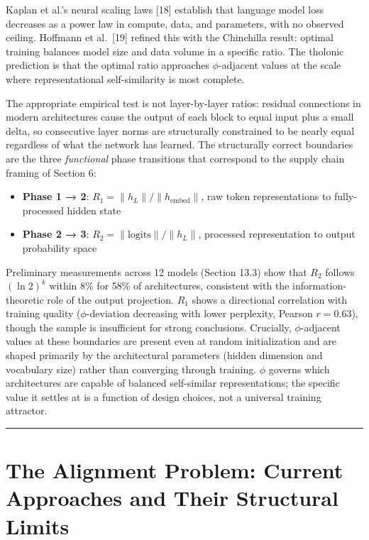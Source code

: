 \documentclass[12pt]{article}
\providecommand{\tightlist}{%
  \setlength{\itemsep}{0pt}\setlength{\parskip}{0pt}}
\begin{document}
Kaplan et al.'s neural scaling laws {[}18{]} establish that language
model loss decreases as a power law in compute, data, and parameters,
with no observed ceiling. Hoffmann et al.~{[}19{]} refined this with the
Chinchilla result: optimal training balances model size and data volume
in a specific ratio. The tholonic prediction is that the optimal ratio
approaches \(\phi\)-adjacent values at the scale where representational
self-similarity is most complete.

The appropriate empirical test is not layer-by-layer ratios: residual
connections in modern architectures cause the output of each block to
equal input plus a small delta, so consecutive layer norms are
structurally constrained to be nearly equal regardless of what the
network has learned. The structurally correct boundaries are the three
\emph{functional} phase transitions that correspond to the supply chain
framing of Section 6:

\begin{itemize}
\tightlist
\item
  \textbf{Phase 1 → 2}: \(R_1 = \|h_L\| / \|h_{\text{embed}}\|\), raw
  token representations to fully-processed hidden state
\item
  \textbf{Phase 2 → 3}: \(R_2 = \|\text{logits}\| / \|h_L\|\), processed
  representation to output probability space
\end{itemize}

Preliminary measurements across 12 models (Section 13.3) show that
\(R_2\) follows \((\ln 2)^k\) within 8\% for 58\% of architectures,
consistent with the information-theoretic role of the output projection.
\(R_1\) shows a directional correlation with training quality
(\(\phi\)-deviation decreasing with lower perplexity, Pearson
\(r = 0.63\)), though the sample is insufficient for strong conclusions.
Crucially, \(\phi\)-adjacent values at these boundaries are present even
at random initialization and are shaped primarily by the architectural
parameters (hidden dimension and vocabulary size) rather than converging
through training. \(\phi\) governs which architectures are capable of
balanced self-similar representations; the specific value it settles at
is a function of design choices, not a universal training attractor.

\begin{center}\rule{0.5\linewidth}{0.5pt}\end{center}

\section{The Alignment Problem: Current Approaches and Their Structural Limits}\label{the-alignment-problem-current-approaches-and-their-structural-limits}
\end{document}
